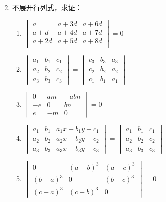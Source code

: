 \begin{enumerate}
\begin{multicols}{2}
\begin{enumerate}[(1)]
\end{enumerate}
\end{multicols}
  \item 不展开行列式，求证：
\begin{enumerate}[(1)]
  \item $\begin{vmatrix}
    a&a+3d&a+6d\\
    a+d&a+4d&a+7d\\
    a+2d&a+5d&a+8d\\
  \end{vmatrix}=0$
  \item $\begin{vmatrix}a_1&b_1&c_1\\a_2&b_2&c_2\\a_3&b_3&c_3\end{vmatrix}=\begin{vmatrix}c_3&b_3&a_3\\c_2&b_2&a_2\\c_1&b_1&a_1\end{vmatrix}$
  \item $\begin{vmatrix}0&am&-abn\\-e&0&bn\\e&-m&0\end{vmatrix}=0$
  \item $\begin{vmatrix}a_1&b_1&a_1x+b_1y+c_1\\a_2&b_2&a_2x+b_2y+c_2\\a_3&b_3&a_3x+b_3y+c_3\end{vmatrix}=\begin{vmatrix}a_1&b_1&c_1\\a_2&b_2&c_2\\a_3&b_3&c_3\end{vmatrix}$
  \item $\begin{vmatrix}0&(a-b)^3&(a-c)^3\\(b-a)^3&0&(b-c)^3\\(c-a)^3&(c-b)^3&0\end{vmatrix}=0$
\end{enumerate}


\end{enumerate}

